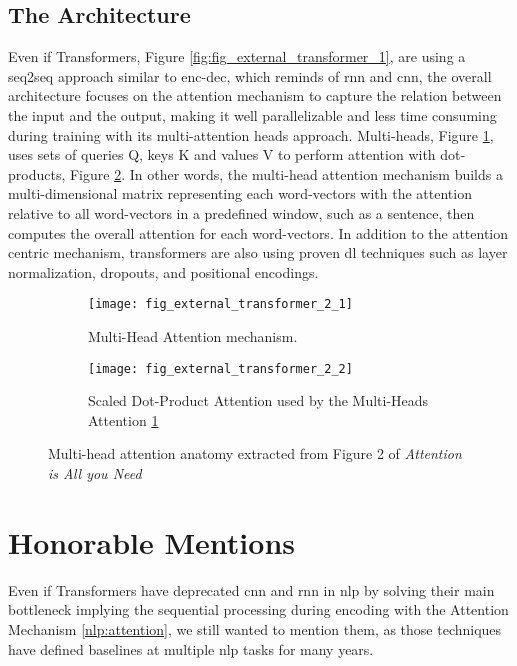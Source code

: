 \subsection{The Architecture}
Even if Transformers, Figure \ref{fig:fig_external_transformer_1}, are using a \gls{seq2seq} approach similar to \gls{enc-dec}, which reminds of \gls{rnn} and \gls{cnn}, the overall architecture focuses on the attention mechanism to capture the relation between the input and the output, making it well parallelizable and less time consuming during training with its multi-attention heads approach. Multi-heads, Figure \ref{fig:fig_external_transformer_2_1}, uses sets of queries Q, keys K and values V to perform attention with dot-products, Figure \ref{fig:fig_external_transformer_2_2}. In other words, the multi-head attention mechanism builds a multi-dimensional matrix representing each word-vectors with the attention relative to all word-vectors in a predefined window, such as a sentence, then computes the overall attention for each word-vectors. In addition to the attention centric mechanism, transformers are also using proven \gls{dl} techniques such as layer normalization, dropouts, and positional encodings.

\begin{figure}[H]
	\begin{subfigure}{.5\textwidth}
		\centering
		\texttt{[image: fig\_external\_transformer\_2\_1]}
		\caption{Multi-Head Attention mechanism.}
		\label{fig:fig_external_transformer_2_1}
	\end{subfigure}
	\hfill
	\begin{subfigure}{.5\textwidth}
		\centering
		\texttt{[image: fig\_external\_transformer\_2\_2]}
    	\caption{Scaled Dot-Product Attention used by the Multi-Heads Attention \ref{fig:fig_external_transformer_2_1}}
    	\label{fig:fig_external_transformer_2_2}
	\end{subfigure}
	\caption{Multi-head attention anatomy extracted from Figure 2 of \textit{Attention is All you Need} \autocite{paper:journals/corr/VaswaniSPUJGKP17}}
	\label{fig:fig_external_transformer_2}
\end{figure}


\section{Honorable Mentions}
Even if Transformers have deprecated \gls{cnn} and \gls{rnn} in \gls{nlp} by solving their main bottleneck implying the sequential processing during encoding with the Attention Mechanism \ref{nlp:attention}, we still wanted to mention them, as those techniques have defined baselines at multiple \gls{nlp} tasks for many years.


